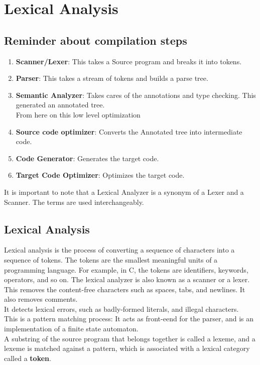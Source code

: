 \chapter{Lexical Analysis}

\section{Reminder about compilation steps}
\begin{enumerate}
    \item \textbf{Scanner/Lexer}: This takes a Source program and breaks it into tokens.
    \item \textbf{Parser}: This takes a stream of tokens and builds a parse tree.
    \item \textbf{Semantic Analyzer}: Takes cares of the annotations and type checking. This generated an annotated tree.\\
    \hline
    From here on this low level optimization
    \hline
\item \textbf{Source code optimizer}: Converts the Annotated tree into intermediate code.
\item \textbf{Code Generator}: Generates the target code.
\item \textbf{Target Code Optimizer}: Optimizes the target code.
\end{enumerate}

It is important to note that a Lexical Analyzer is a synonym of a Lexer and a Scanner. The terms are used interchangeably.

\section{Lexical Analysis}
Lexical analysis is the process of converting a sequence of characters into a sequence of tokens. The tokens are the smallest meaningful units of a programming language. For example, in C, the tokens are identifiers, keywords, operators, and so on. The lexical analyzer is also known as a scanner or a lexer.\\
This removes the content-free characters such as spaces, tabs, and newlines. It also removes comments. 
\\ It detects lexical errors, such as badly-formed literals, and illegal characters.\\
This is a pattern matching process: It acts as front-eend for the parser, and is an implementation of a finite state automaton.\\
A substring of the source program that belongs together is called a lexeme, and a lexeme is matched against a pattern, which is associated with a lexical category called a \textbf{token}.\\


